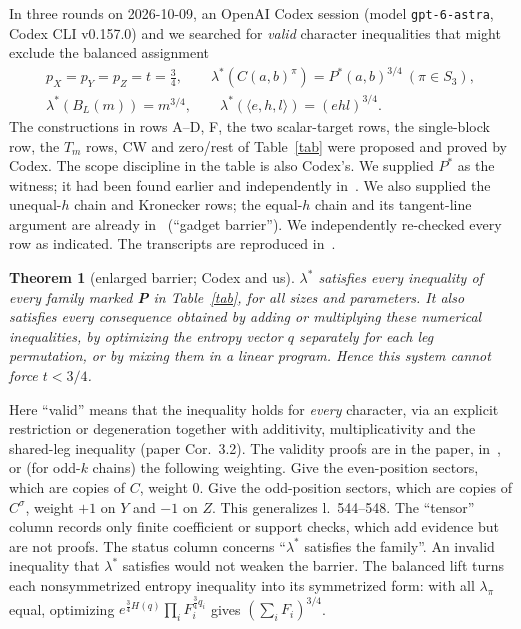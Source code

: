 \documentclass[11pt]{amsart}
\newtheorem{theorem}{Theorem}
\theoremstyle{remark}
\begin{document}
In three rounds on 2026-10-09, an OpenAI Codex session (model
\texttt{gpt-6-astra}, Codex CLI v0.157.0) and we searched for \emph{valid}
character inequalities that might exclude the balanced assignment
\begin{gather*}
p_X=p_Y=p_Z=t=\tfrac34,\qquad
\lambda^*(C(a,b)^\pi)=P^*(a,b)^{3/4}\ (\pi\in S_3),\\
\lambda^*(B_L(m))=m^{3/4},\qquad \lambda^*(\langle e,h,l\rangle)=(ehl)^{3/4}.
\end{gather*}
The constructions in rows A--D, F, the two scalar-target rows, the
single-block row, the $T_m$ rows, CW and zero/rest of
Table~\ref{tab} were proposed and proved by Codex. The scope discipline in
the table is also Codex's. We supplied $P^*$ as the witness; it had been found
earlier and independently in~\cite{EC}. We also supplied the unequal-$h$
chain and Kronecker rows; the equal-$h$ chain and its tangent-line argument
are already in~\cite{EC} (``gadget barrier''). We independently re-checked
every row as indicated. The transcripts are
reproduced in~\cite{SUPP}.

\begin{theorem}[enlarged barrier; Codex and us]\label{thm:enlarged}
$\lambda^*$ satisfies every inequality of every family marked \textbf{P} in
Table~\ref{tab}, for all sizes and parameters. It also satisfies every
consequence obtained by adding or multiplying these numerical inequalities,
by optimizing the entropy vector $q$ separately for each leg permutation, or
by mixing them in a linear program. Hence this system cannot force $t<3/4$.
\end{theorem}

Here ``valid'' means that the inequality holds for \emph{every} character,
via an explicit restriction or degeneration together with additivity,
multiplicativity and the shared-leg inequality (paper Cor.~3.2). The
validity proofs are in the paper, in~\cite{SUPP}, or (for odd-$k$
chains) the following weighting. Give the even-position sectors, which are
copies of $C$, weight $0$. Give the odd-position sectors, which are copies of
$C^\sigma$, weight $+1$ on $Y$ and $-1$ on $Z$. This generalizes l.~544--548.
The ``tensor'' column records only finite coefficient or support checks,
which add evidence but are not proofs. The status column concerns ``$\lambda^*$
satisfies the family''. An invalid inequality that $\lambda^*$ satisfies
would not weaken the barrier. The
balanced lift turns each nonsymmetrized entropy inequality into its
symmetrized form: with all $\lambda_\pi$ equal, optimizing
$e^{\frac34H(q)}\prod_iF_i^{\frac34q_i}$ gives $(\sum_iF_i)^{3/4}$.
\end{document}
